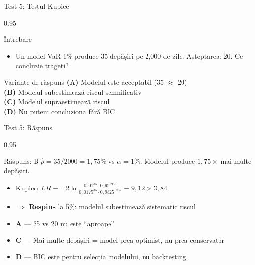 \documentclass[9pt, aspectratio=169, t]{beamer}
\begin{document}
\begin{frame}{Test 5: Testul Kupiec}
\begin{cminipage}{0.95\textwidth}
    \begin{alertblock}{Întrebare}
        \begin{itemize}\setlength{\itemsep}{0pt}
            \item Un model VaR 1\% produce 35 depășiri pe 2{,}000 de zile. Așteptarea: 20. Ce concluzie trageți?
        \end{itemize}
    \end{alertblock}

    \vspace{0.3cm}

    \begin{block}{Variante de răspuns}
        \textcolor{MainBlue}{\textbf{(A)}} Modelul este acceptabil (35 $\approx$ 20)\\[3pt]
        \textcolor{MainBlue}{\textbf{(B)}} Modelul subestimează riscul semnificativ\\[3pt]
        \textcolor{MainBlue}{\textbf{(C)}} Modelul supraestimează riscul\\[3pt]
        \textcolor{MainBlue}{\textbf{(D)}} Nu putem concluziona fără BIC
    \end{block}
\end{cminipage}
\end{frame}

\begin{frame}{Test 5: Răspuns}
\begin{cminipage}{0.95\textwidth}
    \begin{exampleblock}{Răspuns: B}
        $\hat{p} = 35/2000 = 1{,}75\%$ vs $\alpha = 1\%$. Modelul produce $1{,}75\times$ mai multe depășiri.
    \end{exampleblock}

    \vspace{0.2cm}

    \begin{itemize}\setlength{\itemsep}{0pt}
        \item Kupiec: $LR = -2\ln\frac{0{,}01^{35} \cdot 0{,}99^{1965}}{0{,}0175^{35} \cdot 0{,}9825^{1965}} = 9{,}12 > 3{,}84$
        \item $\Rightarrow$ \textbf{Respins} la 5\%: modelul subestimează sistematic riscul
        \item \textbf{A} --- 35 vs 20 nu este ``aproape'' \incorrect
        \item \textbf{C} --- Mai multe depășiri = model prea optimist, nu prea conservator \incorrect
        \item \textbf{D} --- BIC este pentru selecția modelului, nu backtesting \incorrect
    \end{itemize}
\end{cminipage}
\end{frame}
\end{document}
